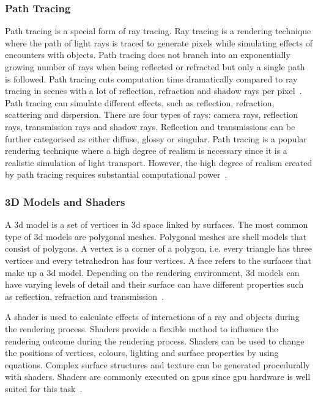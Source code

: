 \subsubsection{Path Tracing}
Path tracing is a special form of ray tracing. Ray tracing is a rendering technique where the path of light rays is traced to generate pixels while simulating effects of encounters with objects. Path tracing does not branch into an exponentially growing number of rays when being reflected or refracted but only a single path is followed. Path tracing cuts computation time dramatically compared to ray tracing in scenes with a lot of reflection, refraction and shadow rays per pixel~\cite{Kajiya1986TheEquation}. Path tracing can simulate different effects, such as reflection, refraction, scattering and dispersion. There are four types of rays: camera rays, reflection rays, transmission rays and shadow rays. Reflection and transmissions can be further categorised as either diffuse, glossy or singular. Path tracing is a popular rendering technique where a high degree of realism is necessary since it is a realistic simulation of light transport. However, the high degree of realism created by path tracing requires substantial computational power~\cite{Vasiou2018ACost}.

\subsubsection{3D Models and Shaders}
A \gls{3d} model is a set of vertices in \gls{3d} space linked by surfaces. The most common type of \gls{3d} models are polygonal meshes. Polygonal meshes are shell models that consist of polygons. A vertex is a corner of a polygon, i.e. every triangle has three vertices and every tetrahedron has four vertices. A face refers to the surfaces that make up a \gls{3d} model. Depending on the rendering environment, \gls{3d} models can have varying levels of detail and their surface can have different properties such as reflection, refraction and transmission~\cite{FoundationCyclesIntroduction}.

A shader is used to calculate effects of interactions of a ray and objects during the rendering process. Shaders provide a flexible method to influence the rendering outcome during the rendering process. Shaders can be used to change the positions of vertices, colours, lighting and surface properties by using equations. Complex surface structures and texture can be generated procedurally with shaders. Shaders are commonly executed on \glspl{gpu} since \gls{gpu} hardware is well suited for this task~\cite{Pharr2010ChapterMaterials, Sans2017ACUDA, Spath2018AdvancedThMAD}.

